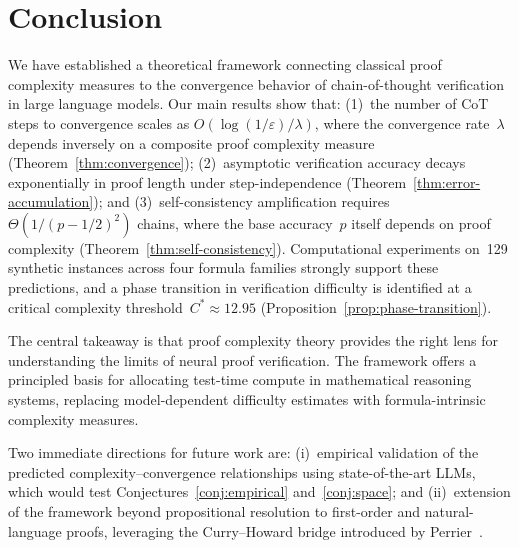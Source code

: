 \section{Conclusion}\label{sec:conclusion}

We have established a theoretical framework connecting classical proof
complexity measures to the convergence behavior of chain-of-thought
verification in large language models.  Our main results show that: (1)~the
number of CoT steps to convergence scales as $O(\log(1/\varepsilon)/\lambda)$,
where the convergence rate~$\lambda$ depends inversely on a composite proof
complexity measure (Theorem~\ref{thm:convergence}); (2)~asymptotic verification
accuracy decays exponentially in proof length under step-independence
(Theorem~\ref{thm:error-accumulation}); and (3)~self-consistency amplification
requires $\Theta(1/(p - 1/2)^2)$ chains, where the base accuracy~$p$ itself
depends on proof complexity (Theorem~\ref{thm:self-consistency}).  Computational
experiments on~129 synthetic instances across four formula families strongly
support these predictions, and a phase transition in verification difficulty is
identified at a critical complexity threshold~$C^* \approx 12.95$
(Proposition~\ref{prop:phase-transition}).

The central takeaway is that proof complexity theory provides the right lens
for understanding the limits of neural proof verification.  The framework
offers a principled basis for allocating test-time compute in mathematical
reasoning systems, replacing model-dependent difficulty estimates with
formula-intrinsic complexity measures.

Two immediate directions for future work are: (i)~empirical validation of the
predicted complexity--convergence relationships using state-of-the-art LLMs,
which would test Conjectures~\ref{conj:empirical} and~\ref{conj:space}; and
(ii)~extension of the framework beyond propositional resolution to first-order
and natural-language proofs, leveraging the Curry--Howard bridge introduced by
Perrier~\cite{perrier2025typed}.
